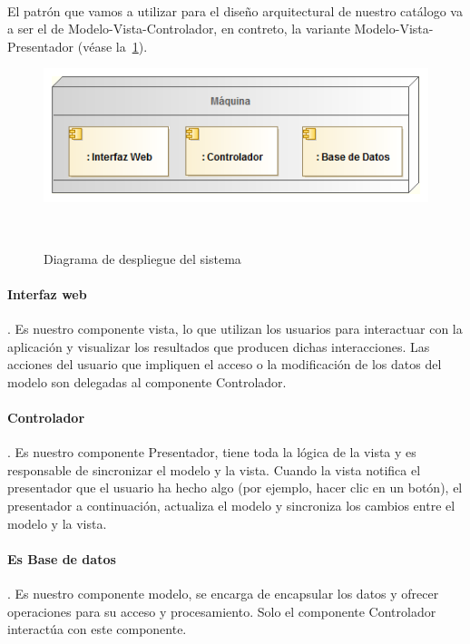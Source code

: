 \paragraph{}El patrón que vamos a utilizar para el diseño arquitectural de nuestro 
catálogo va a ser el de Modelo-Vista-Controlador, en contreto, la variante Modelo-Vista-Presentador 
(véase la~\cref{fig:diagDespliegue}).

\vspace{.2cm}
\begin{figure}[ht]
\centerline{\includegraphics[scale=0.6]{img/diagrama_despliegue}}\
\caption{Diagrama de despliegue del sistema}
\label{fig:diagDespliegue}
\end{figure}


\paragraph{Interfaz web}. Es nuestro componente vista, lo que utilizan los usuarios para 
interactuar con la aplicación y visualizar los resultados que producen dichas
interacciones. Las acciones del usuario que impliquen el acceso o la modificación
de los datos del modelo son delegadas al componente Controlador.

\paragraph{Controlador}. Es nuestro componente Presentador, tiene toda la lógica de la vista 
y es responsable de sincronizar el modelo y la vista. Cuando la vista notifica el 
presentador que el usuario ha hecho algo (por ejemplo, hacer clic en un botón), 
el presentador a continuación, actualiza el modelo y sincroniza los cambios 
entre el modelo y la vista.

\paragraph{Es Base de datos}. Es nuestro componente modelo, se encarga de encapsular 
los datos y ofrecer operaciones para su acceso y procesamiento. Solo el componente
Controlador interactúa con este componente.